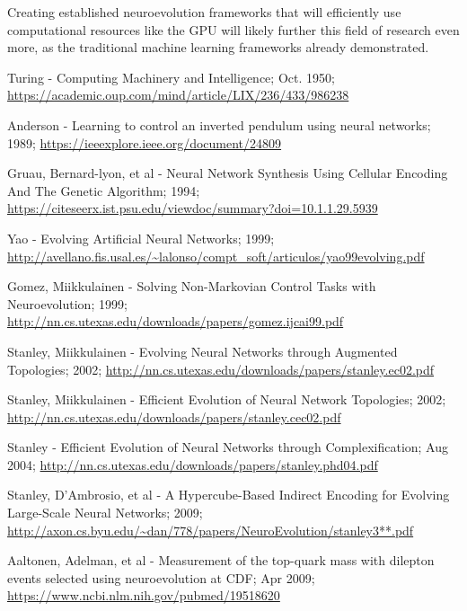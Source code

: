 \documentclass[journal, a4paper]{IEEEtran}
\begin{document}
Creating established neuroevolution frameworks that will efficiently use computational resources like the GPU will likely further this field of research even more, as the traditional machine learning frameworks already demonstrated.




\begin{thebibliography}{5}

    Turing - Computing Machinery and Intelligence; Oct. 1950;
    \url{https://academic.oup.com/mind/article/LIX/236/433/986238}

    Anderson - Learning to control an inverted pendulum using neural networks; 1989;
    \url{https://ieeexplore.ieee.org/document/24809}

    Gruau, Bernard-lyon, et al - Neural Network Synthesis Using Cellular Encoding And The Genetic Algorithm; 1994;
    \url{https://citeseerx.ist.psu.edu/viewdoc/summary?doi=10.1.1.29.5939}

    Yao - Evolving Artificial Neural Networks; 1999;
    \url{http://avellano.fis.usal.es/~lalonso/compt_soft/articulos/yao99evolving.pdf}

    Gomez, Miikkulainen - Solving Non-Markovian Control Tasks with Neuroevolution; 1999;
    \url{http://nn.cs.utexas.edu/downloads/papers/gomez.ijcai99.pdf}

    Stanley, Miikkulainen - Evolving Neural Networks through Augmented Topologies; 2002;
    \url{http://nn.cs.utexas.edu/downloads/papers/stanley.ec02.pdf}

    Stanley, Miikkulainen - Efficient Evolution of Neural Network Topologies; 2002;
    \url{http://nn.cs.utexas.edu/downloads/papers/stanley.cec02.pdf}

    Stanley - Efficient Evolution of Neural Networks through Complexification; Aug 2004;
    \url{http://nn.cs.utexas.edu/downloads/papers/stanley.phd04.pdf}

    Stanley, D’Ambrosio, et al - A Hypercube-Based Indirect Encoding for Evolving Large-Scale Neural Networks; 2009;
    \url{http://axon.cs.byu.edu/~dan/778/papers/NeuroEvolution/stanley3**.pdf}

    Aaltonen, Adelman, et al - Measurement of the top-quark mass with dilepton events selected using neuroevolution at CDF; Apr 2009;
    \url{https://www.ncbi.nlm.nih.gov/pubmed/19518620}


\end{thebibliography}
\end{document}
